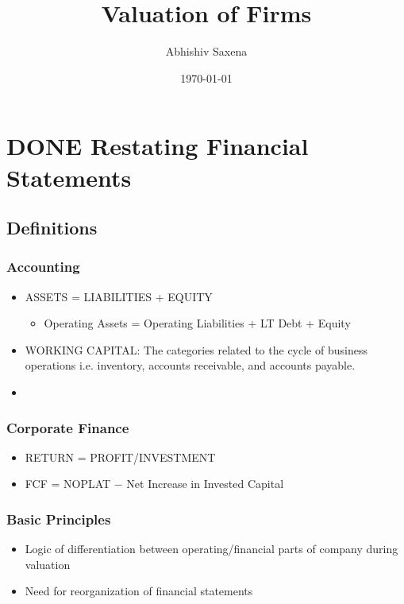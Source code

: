 \documentclass[11pt]{article}
\author{Abhishiv Saxena}
\date{\today}
\title{Valuation of Firms}
\begin{document}
\maketitle
\tableofcontents

\section*{{\bfseries\sffamily DONE} Restating Financial Statements}
\label{sec:org9d70abf}
\subsection*{Definitions}
\label{sec:orgd2f9d0c}
\subsubsection*{Accounting}
\label{sec:org2f4403e}
\begin{itemize}
\item ASSETS = LIABILITIES + EQUITY
\label{sec:org8e2fd7a}
\begin{itemize}
\item Operating Assets = Operating Liabilities + LT Debt + Equity
\label{sec:org538689d}
\end{itemize}
\item WORKING CAPITAL: The categories related to the cycle of business operations i.e. inventory, accounts receivable, and accounts payable.
\label{sec:org0c6671f}
\item 
\label{sec:orge89387a}
\end{itemize}
\subsubsection*{Corporate Finance}
\label{sec:org239a33c}
\begin{itemize}
\item RETURN = PROFIT/INVESTMENT
\label{sec:org89e9a3e}
\item FCF = NOPLAT − Net Increase in Invested Capital
\label{sec:org4035d59}
\end{itemize}
\subsubsection*{Basic Principles}
\label{sec:orgab6628b}
\begin{itemize}
\item Logic of differentiation between operating/financial parts of company during valuation
\label{sec:org6fec9e2}
\item Need for reorganization of financial statements
\label{sec:orgee3e863}
\end{itemize}
\end{document}
